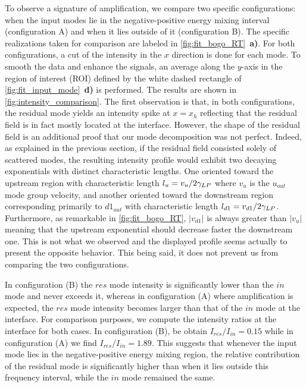 To observe a signature of amplification, we compare two specific configurations: when the input modes lie in the negative-positive energy mixing interval (configuration A) and when it lies outside of it (configuration B). The specific 
realizations taken for comparison are labeled in \autoref{fig:fit_bogo_RT}~\textbf{a)}. For both configurations, a cut of the intensity in the $x$ direction is done for each mode. To smooth the data and enhance the signals, an average along the $y$-axis in the region of interest (ROI) defined by the white dashed rectangle of \autoref{fig:fit_input_mode}~\textbf{d)} is performed. 
The results are shown in \autoref{fig:intensity_comparison}. The first observation is that, in both configurations, the residual mode yields an intensity spike at $x=x_h$ reflecting that the residual field is in fact mostly located at the interface. However, the shape of the residual field is an additional proof that our mode decomposition was not perfect. Indeed, as explained in the previous section, if the residual field consisted solely of scattered modes, the resulting intensity profile would exhibit two decaying exponentials with distinct characteristic lengths.
One oriented toward the upstream region with characteristic length $l_u=v_u/2\gamma_{LP}$ where $v_u$ is the $u_{out}$ mode group velocity, and another oriented toward the downstream region corresponding primarily to $d1_{out}$ with characteristic length $l_{d1}=v_{d1}/2\gamma_{LP}$. Furthermore, as remarkable in \autoref{fig:fit_bogo_RT}, $|v_{d1}|$ is always greater than $|v_u|$ meaning that the upstream exponential should decrease faster the downstream one. This is not what we observed and the displayed profile seems actually to present the opposite behavior.
This being said, it does not prevent us from comparing the two configurations.


In configuration (B) the $res$ mode intensity is significantly lower than the $in$ mode and never exceeds it, whereas in configuration (A) where amplification is expected, the $res$ mode intensity becomes larger than that of the $in$ mode at the interface.
For comparison purposes, we compute the intensity ratios at the interface for both cases. In configuration (B), be obtain $I_{res}/I_{in} = 0.15$ while in configuration (A) we find $I_{res}/I_{in} = 1.89$. This suggests that whenever the input mode lies in the negative-positive energy mixing region, the relative contribution of the residual mode
is significantly higher than when it lies outside this frequency interval, while the $in$ mode remained the same. 

